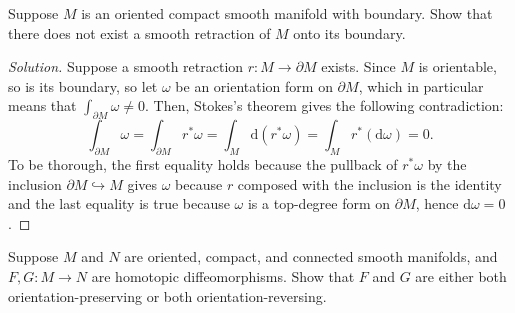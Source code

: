 \documentclass[10pt]{article}
\newcommand{\dd}{\mathrm{d}}
\newenvironment{soln}{\begin{proof}[Solution]}{\end{proof}}
\begin{document}
\begin{problem}
    [16-4]
    Suppose $M$ is an oriented compact smooth manifold with boundary.
    Show that there does not exist a smooth retraction
    of $M$ onto its boundary.
\end{problem}

\begin{soln}
    Suppose a smooth retraction $r\colon M\to\partial M$ exists.
    Since $M$ is orientable, so is its boundary,
    so let $\omega$ be an orientation form on $\partial M$,
    which in particular means that $\int_{\partial M}\omega \ne 0$.
    Then, Stokes's theorem gives the following contradiction:
    \begin{equation*}
	\int_{\partial M}\omega
	= \int_{\partial M} r^*\omega
	= \int_M \dd (r^*\omega) = \int_M r^*(\dd\omega) = 0.
    \end{equation*}
    To be thorough, the first equality holds because
    the pullback of $r^*\omega$ by the inclusion
    $\partial M\hookrightarrow M$ gives $\omega$
    because $r$ composed with the inclusion is the identity
    and the last equality is true because $\omega$ is a top-degree form
    on $\partial M$, hence $\dd\omega = 0$.
\end{soln}

\pagebreak
\begin{problem}
    [16-5]
    Suppose $M$ and $N$ are oriented, compact, and connected
    smooth manifolds, and $F,G\colon M\to N$ are homotopic diffeomorphisms.
    Show that $F$ and $G$ are either both orientation-preserving
    or both orientation-reversing.
\end{problem}
\end{document}
